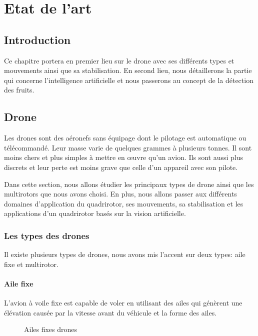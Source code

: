 \chapter{Etat de l'art }

\clearpage
\section*{Introduction}
Ce chapitre portera en premier lieu sur le drone avec ses différents types et mouvements ainsi que sa stabilisation. En second lieu, nous détaillerons la partie qui concerne l'intelligence artificielle et nous passerons au concept de la détection des fruits. 

\section{Drone}	
Les drones sont des aéronefs sans équipage dont le pilotage est automatique ou télécommandé. Leur masse varie de quelques grammes à plusieurs tonnes\cite{Wikipideaa}. Il sont moins chers et plus simples à mettre en œuvre qu'un avion. Ils sont aussi plus discrets et leur perte est moins grave que celle d'un appareil avec son pilote.

Dans cette section, nous allons étudier les principaux types de drone ainsi que les multirotors que nous avons choisi. En plus, nous allons passer aux différents domaines d'application du quadrirotor, ses mouvements, sa stabilisation et les applications d'un quadrirotor basés sur la vision artificielle.   	
\subsection{Les types des drones}
Il existe plusieurs types de drones, nous avons mis l'accent sur deux types: aile fixe et multirotor.

\subsubsection{Aile fixe }
L'avion à voile fixe est capable de voler en utilisant des ailes qui génèrent une élévation causée par la vitesse avant du véhicule et la forme des ailes\cite{educalingo}.


\begin{figure}[H] 
	\begin{center} 
		\centering
		
		
	\end{center}
	
	\caption{Ailes fixes drones}
\end{figure}
